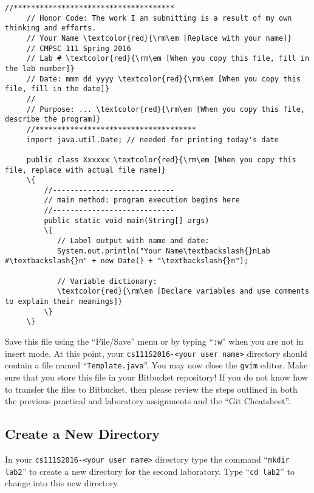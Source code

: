 \newpage
\begin{Verbatim}[commandchars=\\\{\}]
     //*************************************
     // Honor Code: The work I am submitting is a result of my own thinking and efforts.
     // Your Name \textcolor{red}{\rm\em [Replace with your name]}
     // CMPSC 111 Spring 2016
     // Lab # \textcolor{red}{\rm\em [When you copy this file, fill in the lab number]}
     // Date: mmm dd yyyy \textcolor{red}{\rm\em [When you copy this file, fill in the date]}
     //
     // Purpose: ... \textcolor{red}{\rm\em [When you copy this file, describe the program]}
     //*************************************
     import java.util.Date; // needed for printing today's date

     public class Xxxxxx \textcolor{red}{\rm\em [When you copy this file, replace with actual file name]}
     \{
         //----------------------------
         // main method: program execution begins here
         //----------------------------
         public static void main(String[] args)
         \{
            // Label output with name and date:
            System.out.println("Your Name\textbackslash{}nLab #\textbackslash{}n" + new Date() + "\textbackslash{}n");

            // Variable dictionary:
            \textcolor{red}{\rm\em [Declare variables and use comments to explain their meanings]}
         \}
     \}
\end{Verbatim}

\vspace*{-.1in}

\noindent Save this file using the ``File/Save'' menu or by typing ``{\tt :w}'' when you are not in insert mode. At this
point, your {\tt cs111S2016-<your user name>} directory should contain a file named ``{\tt Template.java}''. You may now
close the {\tt gvim} editor. Make sure that you store this file in your Bitbucket repository! If you do not know how to
transfer the files to Bitbucket, then please review the steps outlined in both the previous practical and laboratory
assignments and the ``Git Cheatsheet''.

\vspace*{-.1in}
\subsection*{Create a New Directory}

In your {\tt cs111S2016-<your user name>} directory type the command ``{\tt mkdir lab2}'' to create a new directory for
the second laboratory.
\noindent Type ``{\tt cd lab2}'' to change into this new directory.

